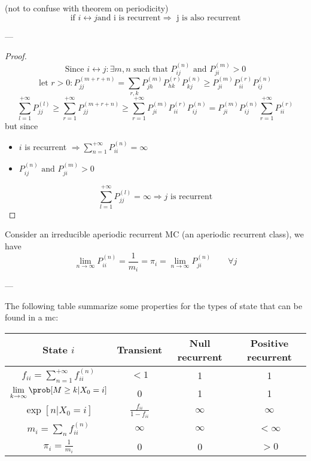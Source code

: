 	\begin{theorem}
		(not to confuse with theorem on periodicity)
		$$\text{if } i\leftrightarrow j \text{and i is recurrent} \Rightarrow \text{ j is also recurrent}$$
	\end{theorem}
	---
	\begin{proof}
		$$\text{Since } i\leftrightarrow j : \exists m,n \text{ such that } P_{ij}^{(n)} \text{ and } P_{ji}^{(m)} > 0$$
		$$\text{let } r>0 : P_{jj}^{(m+r+n)} = \sum\limits_{r, k} P_{jh}^{(m)} P_{hk}^{(r)} P_{kj}^{(n)} \geq P_{ji}^{(m)}  P_{ii}^{(r)}  P_{ij}^{(n)}$$
		$$\sum\limits_{l=1}^{+\infty} P_{jj}^{(l)} \geq \sum\limits_{r=1}^{+\infty} P_{jj}^{(m+r+n)} \geq \sum\limits_{r=1}^{+\infty} P_{ji}^{(m)}  P_{ii}^{(r)}  P_{ij}^{(n)} = P_{ji}^{(m)} P_{ij}^{(n)} \sum\limits_{r=1}^{+\infty} P_{ii}^{(r)}$$
		but since \begin{itemize}
		\item$i$ is recurrent $\Rightarrow \sum\limits_{n=1}^{+\infty} P_{ii}^{(n)} = \infty$
		\item $P_{ij}^{(n)} \text{ and } P_{ji}^{(m)} > 0$
		\end{itemize}
		$$\sum\limits_{l=1}^{+\infty} P_{jj}^{(l)} = \infty \Rightarrow j \text{ is recurrent}$$
  \end{proof}

	\begin{theorem} \label{th:basic_limit_MC}
		Consider an irreducible aperiodic recurrent MC (an aperiodic recurrent class), we have
		$$ \lim_{n\to \infty} P_{ii}^{(n)} = \frac{1}{m_i} = \pi_i = \lim_{n\to\infty} P_{ji}^{(n)} \qquad \forall j$$
	\end{theorem}
	---

	The following table summarize some properties for the types of state that can be found in a \gls{mc}:

	{\renewcommand{\arraystretch}{1.2}
	\begin{center}
		\begin{tabular}{|c||c|c|c|}
			\hline
			State $i$ & Transient & Null recurrent & Positive recurrent \\ \hline
			$f_{ii} = \sum\limits_{n=1}^{+\infty} f_{ii}^{(n)}$ & $<1$ & 1 & 1 \\ \hline
			$\lim\limits_{k \to \infty } \prob[M \geq k | X_0=i]$ & 0 & 1 & 1 \\ \hline
			$\exp[n|X_0=i]$ & $\frac{f_{ii}}{1-f_{ii}}$ & $\infty$ & $\infty$ \\ \hline
			$m_i = \sum\limits_n f_{ii}^{(n)}$ & $\infty$ & $\infty$ & $<\infty$ \\ \hline
			$\pi_i = \frac{1}{m_i}$ & 0 & 0 & $>0$ \\ \hline %
		\end{tabular}
	\end{center}}

